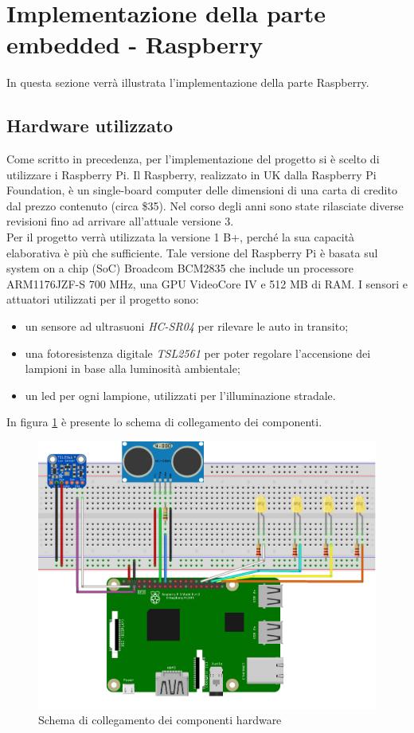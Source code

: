 \section{Implementazione della parte embedded - Raspberry}
In questa sezione verrà illustrata l'implementazione della parte Raspberry.

\subsection{Hardware utilizzato}
Come scritto in precedenza, per l'implementazione del progetto si è scelto di utilizzare i Raspberry Pi.
Il Raspberry, realizzato in UK dalla Raspberry Pi Foundation, è un single-board computer delle dimensioni di una carta di credito dal prezzo contenuto (circa \$35).
Nel corso degli anni sono state rilasciate diverse revisioni fino ad arrivare all’attuale versione 3.
\\Per il progetto verrà utilizzata la versione 1 B+, perché la sua capacità elaborativa è più che sufficiente.
Tale versione del Raspberry Pi è basata sul system on a chip (SoC) Broadcom BCM2835 che include un processore ARM1176JZF-S 700 MHz, una GPU VideoCore IV e 512 MB di RAM.
I sensori e attuatori utilizzati per il progetto sono:
\begin{itemize}
 \item un sensore ad ultrasuoni \textit{HC-SR04} per rilevare le auto in transito;
 \item una fotoresistenza digitale \textit{TSL2561} per poter regolare l'accensione dei lampioni in base alla luminosità ambientale;
 \item un led per ogni lampione, utilizzati per l'illuminazione stradale.
\end{itemize}
In figura \ref{sketch} è presente lo schema di collegamento dei componenti.
\begin{figure}[tbp]
	\centering
	\includegraphics[width=13cm]{figure/Sketch_rpi.png}
	\caption{Schema di collegamento dei componenti hardware \label{sketch}}
\end{figure}

